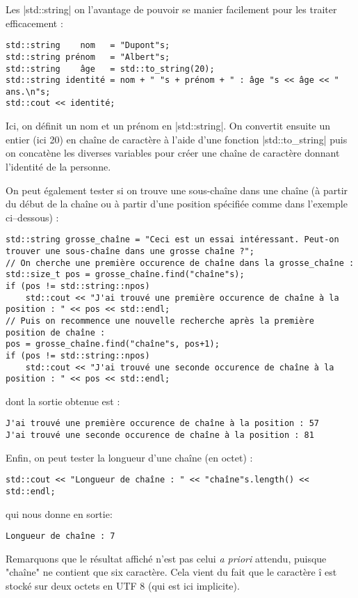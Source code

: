Les |std::string| on l'avantage de pouvoir se manier facilement pour les traiter efficacement :
\begin{lstlisting}[caption=Exemple de manipulation de std::string]
std::string    nom   = "Dupont"s;
std::string prénom   = "Albert"s;
std::string    âge   = std::to_string(20);
std::string identité = nom + " "s + prénom + " : âge "s << âge << " ans.\n"s;
std::cout << identité;
\end{lstlisting}

Ici, on définit un nom et un prénom en |std::string|. On convertit ensuite un entier (ici 20) en chaîne de caractère
à l'aide d'une fonction |std::to_string| puis on concatène les diverses variables pour créer une chaîne de caractère
donnant l'identité de la personne.

On peut également tester si on trouve une sous-chaîne dans une chaîne (à partir du début de la chaîne ou à partir d'une position spécifiée comme dans l'exemple ci--dessous) :
\begin{lstlisting}[caption=Exemple de recherche d'une sous-chaîne dans une chaîne]
std::string grosse_chaîne = "Ceci est un essai intéressant. Peut-on trouver une sous-chaîne dans une grosse chaîne ?";
// On cherche une première occurence de chaîne dans la grosse_chaîne :
std::size_t pos = grosse_chaîne.find("chaîne"s);
if (pos != std::string::npos)
    std::cout << "J'ai trouvé une première occurence de chaîne à la position : " << pos << std::endl;
// Puis on recommence une nouvelle recherche après la première position de chaîne :
pos = grosse_chaîne.find("chaîne"s, pos+1);
if (pos != std::string::npos)
    std::cout << "J'ai trouvé une seconde occurence de chaîne à la position : " << pos << std::endl;
\end{lstlisting}
dont la sortie obtenue est :
\begin{verbatim}
J'ai trouvé une première occurence de chaîne à la position : 57
J'ai trouvé une seconde occurence de chaîne à la position : 81
\end{verbatim}

Enfin, on peut tester la longueur d'une chaîne (en octet) : 
\begin{lstlisting}
std::cout << "Longueur de chaîne : " << "chaîne"s.length() << std::endl;
\end{lstlisting}
qui nous donne en sortie:
\begin{verbatim}
Longueur de chaîne : 7
\end{verbatim}

Remarquons que le résultat affiché n'est pas celui \textsl{a priori} attendu, puisque "chaîne" ne contient que six
caractère. Cela vient du fait que le caractère $î$ est stocké sur deux octets en UTF 8 (qui est ici implicite).

